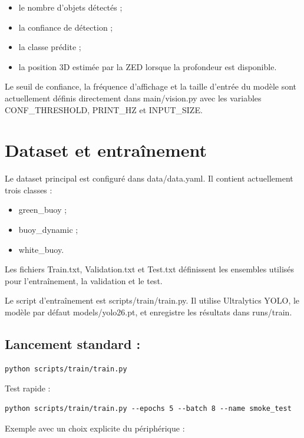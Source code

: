 \documentclass[11pt,letterpaper]{article}
\begin{document}
\begin{itemize}
    \item le nombre d’objets détectés ;
    \item la confiance de détection ;
    \item la classe prédite ;
    \item la position 3D estimée par la ZED lorsque la profondeur est disponible.
\end{itemize}

Le seuil de confiance, la fréquence d’affichage et la taille d’entrée du modèle sont actuellement définis directement dans main/vision.py avec les variables CONF\_THRESHOLD, PRINT\_HZ et INPUT\_SIZE.

\section{Dataset et entraînement}

Le dataset principal est configuré dans data/data.yaml. Il contient actuellement trois classes :

\begin{itemize}
    \item green\_buoy ;
    \item buoy\_dynamic ;
    \item white\_buoy.
\end{itemize}

Les fichiers Train.txt, Validation.txt et Test.txt définissent les ensembles utilisés pour l’entraînement, la validation et le test.

Le script d’entraînement est scripts/train/train.py. Il utilise Ultralytics YOLO, le modèle par défaut models/yolo26.pt, et enregistre les résultats dans runs/train.

\subsection{Lancement standard :}

\begin{verbatim}
python scripts/train/train.py
\end{verbatim}

Test rapide :

\begin{verbatim}
python scripts/train/train.py --epochs 5 --batch 8 --name smoke_test
\end{verbatim}

Exemple avec un choix explicite du périphérique :
\end{document}
